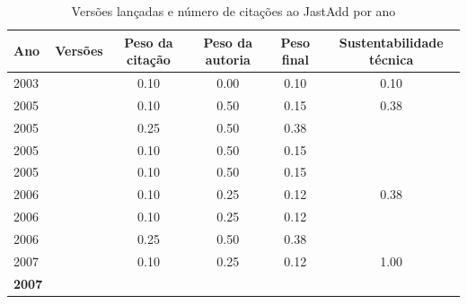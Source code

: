 \begin{table}[H]
\caption{Versões lançadas e número de citações ao JastAdd por ano}
\centering
\begin{tabular}{| l | c | c | c | c | c |}
  \hline
  Ano & Versões & Peso da citação & Peso da autoria & Peso final & Sustentabilidade técnica \\
  \hline
            2003
          &
          
          &
          0.10
          &
          0.00
          &
          0.10
          &
            {\color{red} 0.10}
          \\
\hline
            2005
          &
          
          &
          0.10
          &
          0.50
          &
          0.15
          &
            {\color{red} 0.38}
          \\
            2005
          &
          
          &
          0.25
          &
          0.50
          &
          0.38
          &
          \\
            2005
          &
          
          &
          0.10
          &
          0.50
          &
          0.15
          &
          \\
            2005
          &
          
          &
          0.10
          &
          0.50
          &
          0.15
          &
          \\
\hline
            2006
          &
          
          &
          0.10
          &
          0.25
          &
          0.12
          &
            {\color{red} 0.38}
          \\
            2006
          &
          
          &
          0.10
          &
          0.25
          &
          0.12
          &
          \\
            2006
          &
          
          &
          0.25
          &
          0.50
          &
          0.38
          &
          \\
\hline
            2007
          &
          
          &
          0.10
          &
          0.25
          &
          0.12
          &
            {\color{blue} 1.00}
          \\
            {\bf 2007}
          &
          

\end{tabular}
\end{table}
